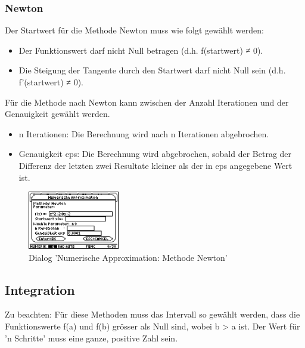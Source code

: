 \documentclass[
	a4paper							%
	,12pt							%
	,twoside						%
	,openright						%
]{scrreprt}							%
\begin{document}
\subsubsection*{Newton}
Der Startwert f\"ur die Methode Newton muss wie folgt gew\"ahlt werden:
\begin{itemize}
  \item Der Funktionswert darf nicht Null betragen (d.h. f(startwert) ≠ 0).
  \item Die Steigung der Tangente durch den Startwert darf nicht Null sein (d.h. f’(startwert) ≠ 0).
\end{itemize}
F\"ur die Methode nach Newton kann zwischen der Anzahl Iterationen und der Genauigkeit gew\"ahlt werden.
\begin{itemize}
  \item n Iterationen: Die Berechnung wird nach n Iterationen ab­ge­bro­chen.
  \item Genauigkeit eps: Die Berechnung wird abgebrochen, sobald der Betrag der Differenz der letzten zwei Resultate kleiner als der in eps angegebene Wert ist.
\end{itemize}
\begin{figure}[h]
  \centering
  \includegraphics[width=4cm]{img/nummeth_image022.png}
  \caption{Dialog 'Numerische Approximation: Methode Newton'}
  \label{fig:ParameterApproximationNewton}
\end{figure}

\subsection{Integration}
Zu beachten: F\"ur diese Methoden muss das Intervall so gew\"ahlt werden, dass die Funktions­werte f(a) und f(b) gr\"osser als Null sind, wobei b > a ist. Der Wert f\"ur 'n Schritte' muss eine ganze, positive Zahl sein.
\end{document}
